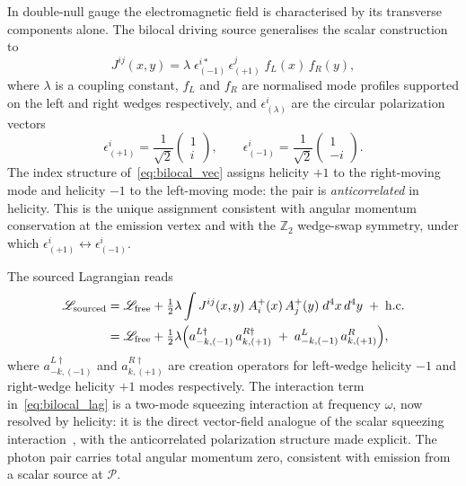\documentclass[12pt,a4paper]{article}
\begin{document}
In double-null gauge the electromagnetic field is characterised by its transverse components
alone. The bilocal driving source generalises the scalar construction to
\begin{equation}
    J^{ij}(x,y) = \lambda\; \epsilon^{i*}_{(-1)}\, \epsilon^{j}_{(+1)}\; f_L(x)\, f_R(y),
\label{eq:bilocal_vec}
\end{equation}
where $\lambda$ is a coupling constant, $f_L$ and $f_R$ are normalised mode profiles supported
on the left and right wedges respectively, and $\epsilon^i_{(\lambda)}$ are the circular
polarization vectors
\begin{equation}
    \epsilon^i_{(+1)} = \frac{1}{\sqrt{2}}\begin{pmatrix}1\\i\end{pmatrix}, \qquad
    \epsilon^i_{(-1)} = \frac{1}{\sqrt{2}}\begin{pmatrix}1\\-i\end{pmatrix}.
\end{equation}
The index structure of~\eqref{eq:bilocal_vec} assigns helicity $+1$ to the right-moving mode
and helicity $-1$ to the left-moving mode: the pair is \emph{anticorrelated} in helicity. This
is the unique assignment consistent with angular momentum conservation at the emission vertex
and with the $\mathbb{Z}_2$ wedge-swap symmetry, under which $\epsilon^i_{(+1)} \leftrightarrow
\epsilon^i_{(-1)}$.

The sourced Lagrangian reads
\begin{equation}
\begin{aligned}
    \mathscr{L}_{\text{sourced}}
    &= \mathscr{L}_{\text{free}}
      + \tfrac{1}{2}\lambda \int
          J^{ij}(x,y)\; A^+_i(x)\, A^+_j(y)\; d^4x\, d^4y
      \;+\; \text{h.c.} \\
    &= \mathscr{L}_{\text{free}}
      + \tfrac{1}{2}\lambda
        \Bigl(
          a^{L\dagger}_{-k,(-1)}\, a^{R\dagger}_{k,(+1)}
          \;+\;
          a^{L}_{-k,(-1)}\, a^{R}_{k,(+1)}
        \Bigr),
\end{aligned}
\label{eq:bilocal_lag}
\end{equation}
where $a^{L\dagger}_{-k,(-1)}$ and $a^{R\dagger}_{k,(+1)}$ are creation operators for left-wedge helicity $-1$ and right-wedge helicity $+1$ modes respectively. The interaction term in~\eqref{eq:bilocal_lag} is a two-mode squeezing interaction at frequency $\omega$, now resolved by helicity: it is the direct vector-field analogue of the scalar squeezing interaction~\cite{gerry2023introductory}, with the anticorrelated polarization structure made explicit. The photon pair carries total angular momentum zero, consistent with emission from a scalar source at $\mathcal{P}$.
\end{document}
